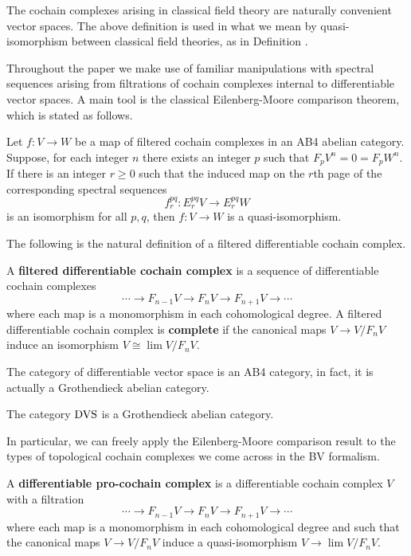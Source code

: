 \documentclass[10pt, oneside]{article}
\begin{document}
The cochain complexes arising in classical field theory are naturally convenient vector spaces. 
The above definition is used in what we mean by quasi-isomorphism between classical field theories, as in Definition .

Throughout the paper we make use of familiar manipulations with spectral sequences arising from filtrations of cochain complexes internal to differentiable vector spaces. 
A main tool is the classical Eilenberg-Moore comparison theorem, which is stated as follows.

\begin{thm}
Let $f : V \to W$ be a map of filtered cochain complexes in an AB4 abelian category.
Suppose, for each integer $n$ there exists an integer $p$ such that $F_p V^n = 0 = F_p W^n$.
If there is an integer $r \geq 0$ such that the induced map on the $r$th page of the corresponding spectral sequences 
\[
f_r^{pq} :  E_r^{pq} V \to E_r^{pq} W
\]
is an isomorphism for all $p,q$, then $f : V \to W$ is a quasi-isomorphism. 
\end{thm}

The following is the natural definition of a filtered differentiable cochain complex. 

\begin{dfn}
A {\bf filtered differentiable cochain complex} is a sequence of differentiable cochain complexes
\[
\cdots \to F_{n-1} V \to F_{n} V \to F_{n+1}V \to \cdots
\]
where each map is a monomorphism in each cohomological degree. 
A filtered differentiable cochain complex is {\bf complete} if the canonical maps $V \to V / F_n V$ induce an isomorphism $V \cong \lim V / F_n V$. 
\end{dfn}

The category of differentiable vector space is an AB4 category, in fact, it is actually a Grothendieck abelian category. 

\begin{thm}
The category ${\rm DVS}$ is a Grothendieck abelian category.
\end{thm}

In particular, we can freely apply the Eilenberg-Moore comparison result to the types of topological cochain complexes we come across in the BV formalism. 

\begin{dfn}\label{dfn: pro}
A {\bf differentiable pro-cochain complex} is a differentiable cochain complex $V$ with a filtration
\[
\cdots \to F_{n-1} V \to F_{n} V \to F_{n+1}V \to \cdots
\]
where each map is a monomorphism in each cohomological degree and such that the canonical maps $V \to V / F_n V$ induce a quasi-isomorphism $V \to \lim V / F_n V$. 
\end{dfn}
\end{document}
